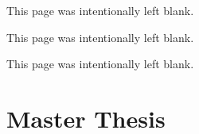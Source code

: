 \documentclass[10pt, a4paper, oneside]{journal}
\begin{document}
	\tableofcontents
	\newpage
	\begin{center}
		This page was intentionally left blank.
	\end{center}
	\newpage
	\listoftables
	\newpage
	\begin{center}
		This page was intentionally left blank.
	\end{center}
	\newpage
	\listoffigures
	\newpage
	
	\begin{center}
		This page was intentionally left blank.
	\end{center}
	\newpage
	\part{Master Thesis}
	
	
	
	
	
	\newpage
	
	
\end{document}
